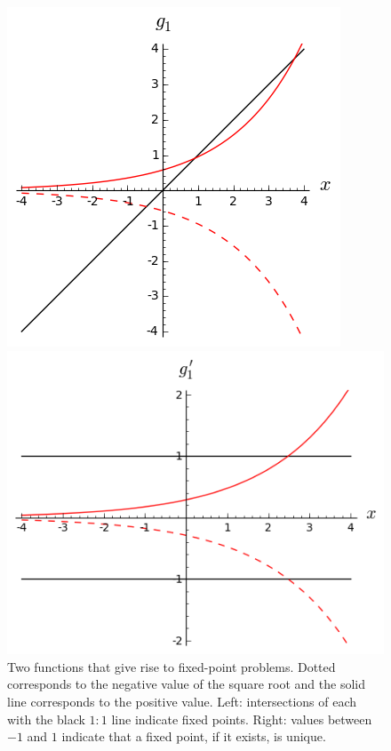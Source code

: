 \documentclass[11pt]{article}
\begin{document}
\begin{figure}[h!]
\begin{minipage}{0.48\textwidth}
\includegraphics[width=\textwidth]{g1.png}
\end{minipage}
\begin{minipage}{0.48\textwidth}
\includegraphics[width=\textwidth]{g1p.png}
\end{minipage}
\caption{Two functions that give rise to fixed-point problems. Dotted corresponds to the negative value of the square root and the solid line corresponds to the positive value. Left: intersections of each with the black \(1:1\) line indicate fixed points. Right: values between \(-1\) and \(1\) indicate that a fixed point, if it exists, is unique.}\label{fig::g1}
\end{figure}
\end{document}
